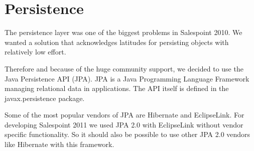 \section{Persistence}
The persistence layer was one of the biggest problems in Salespoint 2010. We wanted a solution that acknowledges latitudes for persisting objects with relatively low effort.

Therefore and because of the huge community support, we decided to use the Java Persistence API (JPA). JPA is a Java Programming Language Framework managing relational data in applications. The API itself is defined in the javax.persistence package.

Some of the most popular vendors of JPA are Hibernate and EclipseLink. For developing Salespoint 2011 we used JPA 2.0 with EclipseLink without vendor specific functionality. So it should also be possible to use other JPA 2.0 vendors like Hibernate with this framework.
